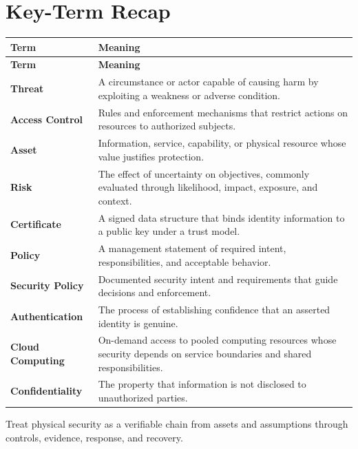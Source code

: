 \documentclass[11pt]{article}
\begin{document}
\section*{Key-Term Recap}
\begin{longtable}{>{\RaggedRight\arraybackslash}p{}>{\RaggedRight\arraybackslash}p{}}
\toprule\rowcolor{Navy}\color{white}\textbf{Term} & \color{white}\textbf{Meaning}\\\midrule
\endfirsthead
\toprule\rowcolor{Navy}\color{white}\textbf{Term} & \color{white}\textbf{Meaning}\\\midrule
\endhead
\textbf{Threat} & A circumstance or actor capable of causing harm by exploiting a weakness or adverse condition. \\\midrule
\textbf{Access Control} & Rules and enforcement mechanisms that restrict actions on resources to authorized subjects. \\\midrule
\textbf{Asset} & Information, service, capability, or physical resource whose value justifies protection. \\\midrule
\textbf{Risk} & The effect of uncertainty on objectives, commonly evaluated through likelihood, impact, exposure, and context. \\\midrule
\textbf{Certificate} & A signed data structure that binds identity information to a public key under a trust model. \\\midrule
\textbf{Policy} & A management statement of required intent, responsibilities, and acceptable behavior. \\\midrule
\textbf{Security Policy} & Documented security intent and requirements that guide decisions and enforcement. \\\midrule
\textbf{Authentication} & The process of establishing confidence that an asserted identity is genuine. \\\midrule
\textbf{Cloud Computing} & On-demand access to pooled computing resources whose security depends on service boundaries and shared responsibilities. \\\midrule
\textbf{Confidentiality} & The property that information is not disclosed to unauthorized parties. \\\midrule
\bottomrule
\end{longtable}
\begin{takeawaybox}
Treat physical security as a verifiable chain from assets and assumptions through controls, evidence, response, and recovery.
\end{takeawaybox}
\end{document}
